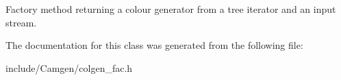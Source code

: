 Factory method returning a colour generator from a tree iterator and an input stream. 



The documentation for this class was generated from the following file\-:\begin{DoxyCompactItemize}
\item 
include/\-Camgen/colgen\-\_\-fac.\-h\end{DoxyCompactItemize}
